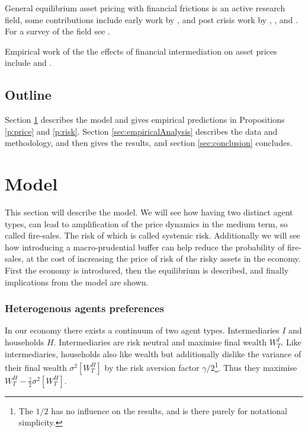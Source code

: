 \documentclass[11pt]{article}
\begin{document}
General equilibrium asset pricing with financial frictions is an active research field, some contributions include early work by \citet{Geanakoplos1997, geanakoplos2003}, and post crisis work by \citet{Brunnermeier2009}, \citet{He2013}, and \citet{Brunnermeier2014}. For a survey of the field see \citet{Brunnermeier2013}.

Empirical work of the the effects of financial intermediation on asset prices include \citet{Adrian2010,Adrian2014} and \citet{Marchuk2017}.

\subsection*{Outline}

Section \ref{sec:model} describes the model and gives empirical predictions in Propositions \ref{p:price} and \ref{p:risk}. Section \ref{sec:empiricalAnalysis} describes the data and methodology, and then gives %
the results, and section \ref{sec:conclusion} concludes.




\section{Model} \label{sec:model}

This section will describe the model. We will see how having two distinct agent types, can lead to amplification of the price dynamics in the medium term, so called fire-sales. The risk of which is called systemic risk. Additionally we will see how introducing a macro-prudential buffer can help reduce the probability of fire-sales, at the cost of increasing the price of risk of the risky assets in the economy. First the economy is introduced, then the equilibrium is described, and finally implications from the model are shown. 

\subsubsection*{Heterogenous agents preferences}

In our economy there exists a continuum of two agent types. Intermediaries $I$ and households $H$. Intermediaries are risk neutral and maximise final wealth $W^I_T$. Like intermediaries, households also like wealth but additionally dislike the variance of their final wealth $\sigma^2[W^H_T]$ by the risk aversion factor $\gamma/2$\footnote{The $1/2$ has no influence on the results, and is there purely for notational simplicity.}. Thus they maximise $W^H_T - \frac{\gamma}{2}\sigma^2[W^H_T]$.
\end{document}
